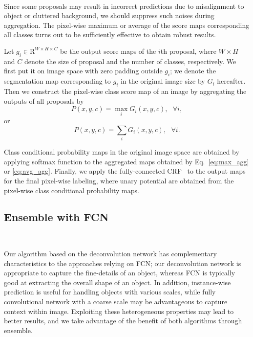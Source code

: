 \documentclass[10pt,twocolumn,letterpaper]{article}
\begin{document}
\ifdefined{} \\ \fi
Since some proposals may result in incorrect predictions due to misalignment to object or cluttered background, we should suppress such noises during aggregation.
The pixel-wise maximum or average of the score maps corresponding all classes turns out to be sufficiently effective to obtain robust results.

Let $g_i\in \mathrm{R}^{W\times H\times C}$ be the output score maps of the $i$th proposal, where $W\times H$ and $C$ denote the size of proposal and the number of classes, respectively.
We first put it on image space with zero padding outside $g_i$; we denote the segmentation map corresponding to $g_i$ in the original image size by $G_i$ hereafter. 
Then we construct the pixel-wise class score map of an image by aggregating the outputs of all proposals by
\begin{equation}
P(x,y,c) = \max_i G_i(x,y,c), ~~~\forall i,
\label{eq:max_agg}
\end{equation}
or
\begin{equation}
P(x,y,c) = \sum_i G_i(x,y,c), ~~~\forall i.
\label{eq:avg_agg}
\end{equation}


Class conditional probability maps in the original image space are obtained by applying softmax function to the aggregated maps obtained by Eq.~\eqref{eq:max_agg} or \eqref{eq:avg_agg}.
Finally, we apply the fully-connected CRF~\cite{Fullycrf} to the output maps for the final pixel-wise labeling, where unary potential are obtained from the pixel-wise class conditional probability maps.


\subsection{Ensemble with FCN}
\label{sec:ensemble}
\ifdefined{} \\ \fi
\iffalse
As described earlier, the proposed semantic segmentation algorithm based on deconvolution network and instance-wise prediction has very different characteristics compared to approaches based on FCN.
\fi
Our algorithm based on the deconvolution network has complementary characteristics to the approaches relying on FCN; our deconvolution network is appropriate to capture the fine-details of an object, whereas FCN is typically good at extracting the overall shape of an object.
In addition, instance-wise prediction is useful for handling objects with various scales, while fully convolutional network with a coarse scale may be advantageous to capture context within image.
Exploiting these heterogeneous properties may lead to better results, and we take advantage of the benefit of both algorithms through ensemble.
\end{document}
